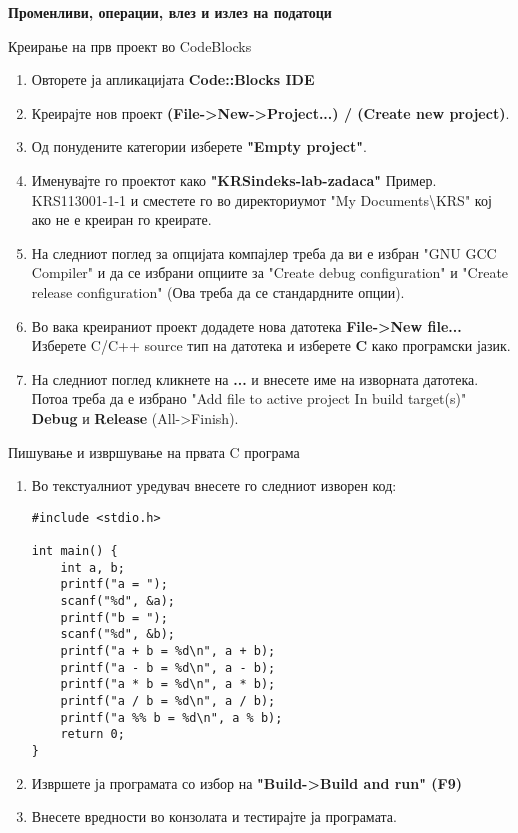 \documentclass[12pt,a4paper]{exam}
\begin{document}
\pagestyle{headandfoot}
\headrule
{}
\begin{center}
\Large{\textbf{Променливи, операции, влез и излез на податоци}}
\end{center}
\begin{questions}
\question
Креирање на прв проект во CodeBlocks
\begin{enumerate}
\item Овторете ја апликацијата \textbf{Code::Blocks IDE}
\item Креирајте нов проект \textbf{(File->New->Project...) / (Create new project)}.
\item Од понудените категории изберете \textbf{"Empty project"}.
\item Именувајте го проектот како \textbf{"KRS{indeks}-{lab}-{zadaca}"} Пример. KRS113001-1-1 и сместете го во директориумот "My Documents\textbackslash KRS" кој ако не е креиран го креирате.
\item На следниот поглед за опцијата компајлер треба да ви е избран "GNU GCC Compiler" и да се избрани опциите за "Create debug configuration" и "Create release configuration" (Ова треба да се стандардните опции).
\item Во вака креираниот проект додадете нова датотека \textbf{File->New file...} Изберете C/C++ source тип на датотека и изберете \textbf{C} како програмски јазик.
\item На следниот поглед кликнете на \textbf{...} и внесете име на изворната датотека. Потоа треба да е избрано "Add file to active project In build target(s)" \textbf{Debug} и \textbf{Release} (All->Finish).
\end{enumerate}
\question
Пишување и извршување на првата C програма
\begin{enumerate}
\item Во текстуалниот уредувач внесете го следниот изворен код:
\begin{lstlisting}
#include <stdio.h>

int main() {
    int a, b;
    printf("a = ");
    scanf("%d", &a);
    printf("b = ");
    scanf("%d", &b);
    printf("a + b = %d\n", a + b);
    printf("a - b = %d\n", a - b);
    printf("a * b = %d\n", a * b);
    printf("a / b = %d\n", a / b);
    printf("a %% b = %d\n", a % b);
    return 0;
}
\end{lstlisting}
\item Извршете ја програмата со избор на \textbf{"Build->Build and run" (F9)}
\item Внесете вредности во конзолата и тестирајте ја програмата.
\end{enumerate}


\end{questions}
\end{document}
